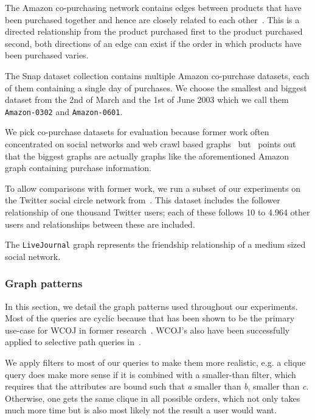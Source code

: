 The Amazon co-purchasing network contains edges between products that have been purchased together and hence are closely related to each other~\cite{snapnets}.
This is a directed relationship from the product purchased first to the product purchased second, both directions of an edge can exist if the order in which
products have been purchased varies.

The Snap dataset collection contains multiple Amazon co-purchase datasets, each of them containing a single day of purchases.
We choose the smallest and biggest dataset from the 2nd of March and the 1st of June 2003 which we call them \texttt{Amazon-0302} and
\texttt{Amazon-0601}.

We pick co-purchase datasets for evaluation because former work often concentrated on social networks and web crawl based
graphs~\cite{myria-detailed,ammar2018distributed} but~\cite{salihoglu2018} points out that the biggest graphs are actually graphs like
the aforementioned Amazon graph containing purchase information.

To allow comparisons with former work, we run a subset of our experiments on the Twitter social circle network from~\cite{snapnets}.
This dataset includes the follower relationship of one thousand Twitter users; each of these follows 10 to 4.964 other users and
relationships between these are included.

The \texttt{LiveJournal} graph represents the friendship relationship of a medium sized social network.

\subsubsection{Graph patterns}

In this section, we detail the graph patterns used throughout our experiments.
Most of the queries are cyclic because that has been shown to be the primary use-case for WCOJ in former research~\cite{olddog,myria-detailed}.
WCOJ's also have been successfully applied to selective path queries in~\cite{olddog,longbin}.

We apply filters to most of our queries to make them more realistic, e.g. a clique query does make more sense if it is combined with a
smaller-than filter, which requires that the attributes are bound such that \textit{a} smaller than \textit{b}, smaller than \textit{c}.
Otherwise, one gets the same clique in all possible orders, which not only takes much more time but is also most
likely not the result a user would want.

